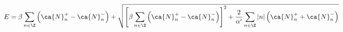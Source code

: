 \begin{equation}
E = \beta \sum_{n \in \Z} \left( \ca{N}^+_n - \ca{N}^-_n \right)
+ \sqrt{ \left[ \beta \sum_{n \in \Z} \left( \ca{N}^+_n - \ca{N}^-_n \right)
\right]^2 + \frac{2}{\alpha'} \sum_{n \in \Z} 
|n| \left( \ca{N}^+_n + \ca{N}^-_n \right) }
\end{equation}

